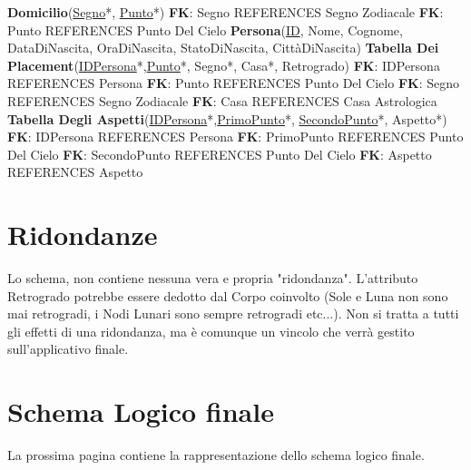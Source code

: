 \textbf{Domicilio}(\underline{Segno}*, \underline{Punto}*)\newline
\textbf{FK}: Segno REFERENCES Segno Zodiacale\newline
\textbf{FK}: Punto REFERENCES Punto Del Cielo\newline\newline
\textbf{Persona}(\underline{ID}, Nome, Cognome, DataDiNascita, OraDiNascita, StatoDiNascita, CittàDiNascita)\newline\newline
\textbf{Tabella Dei Placement}(\underline{IDPersona}*,\underline{Punto}*, Segno*, Casa*, Retrogrado)\newline
\textbf{FK}: IDPersona REFERENCES Persona\newline
\textbf{FK}: Punto REFERENCES Punto Del Cielo\newline
\textbf{FK}: Segno REFERENCES Segno Zodiacale\newline
\textbf{FK}: Casa REFERENCES Casa Astrologica\newline\newline
\textbf{Tabella Degli Aspetti}(\underline{IDPersona}*,\underline{PrimoPunto}*, \underline{SecondoPunto}*, Aspetto*)\newline
\textbf{FK}: IDPersona REFERENCES Persona\newline
\textbf{FK}: PrimoPunto REFERENCES Punto Del Cielo\newline
\textbf{FK}: SecondoPunto REFERENCES Punto Del Cielo\newline
\textbf{FK}: Aspetto REFERENCES Aspetto\newline

\section{Ridondanze}
Lo schema, non contiene nessuna vera e propria "ridondanza".\newline
L'attributo Retrogrado potrebbe essere dedotto dal Corpo coinvolto (Sole e Luna non sono mai retrogradi, i Nodi Lunari sono sempre retrogradi etc...). Non si tratta a tutti gli effetti di una ridondanza, ma è comunque un vincolo che verrà gestito sull'applicativo finale.
\section{Schema Logico finale}
La prossima pagina contiene la rappresentazione dello schema logico finale.

